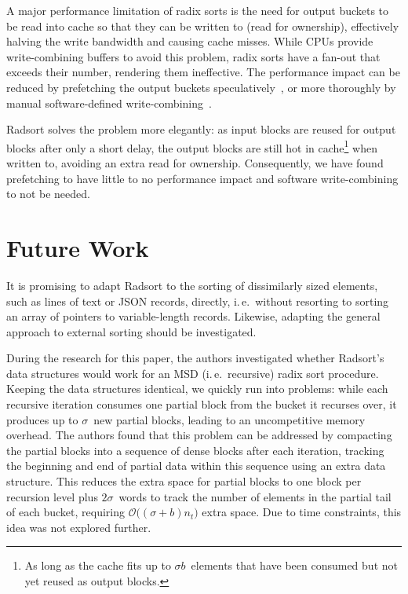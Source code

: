 \documentclass[nolineno,a4paper,UKenglish,cleveref, autoref, thm-restate]{socg-lipics-v2021}
\begin{document}
A major performance limitation of radix sorts is the need for
output buckets to be read into cache so that they can be written to (read for
ownership), effectively halving the write bandwidth and causing cache misses.
While CPUs provide write-combining buffers to avoid this problem, radix sorts
have a fan-out that exceeds their number, rendering them ineffective.
The performance impact can be reduced by prefetching the output buckets
speculatively~\cite{Downs2019}, or more thoroughly by manual software-defined
write-combining~\cite{Wassenberg2010}.

Radsort solves the problem more elegantly: as input blocks are
reused for output blocks after only a short delay, the output blocks are still
hot in cache\footnote{As long as the cache fits up to $\sigma b$~elements
that have been consumed but not yet reused as output blocks.}
when written to, avoiding an extra read for ownership.
Consequently, we have found prefetching to have little to no performance impact
and software write-combining to not be needed.

\section{Future Work}
It is promising to adapt Radsort to the sorting of dissimilarly sized
elements, such as lines of text or JSON records, directly, i.\,e.~without resorting
to sorting an array of pointers to variable-length records.  Likewise, adapting
the general approach to external sorting should be investigated.

During the research for this paper, the authors investigated whether
Radsort's data structures would work for an MSD (i.\,e.~recursive) radix sort
procedure.
Keeping the data structures identical, we quickly run into problems: while each
recursive iteration consumes one partial block from the bucket it recurses over,
it produces up to $\sigma$~new partial blocks, leading to an uncompetitive memory
overhead.
The authors found that this problem can be addressed by compacting the partial
blocks into a sequence of dense blocks after each iteration, tracking the beginning
and end of partial data within this sequence using an extra data structure.
This reduces the extra space for partial blocks to one block per recursion level plus
$2\sigma$~words to track the number of elements in the partial tail of each bucket,
requiring $\mathcal O\bigl((\sigma+b)n_t\bigr)$ extra space.
Due to time constraints, this idea was not explored further.
\end{document}

